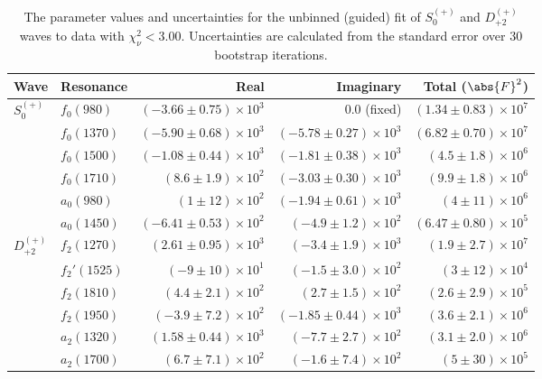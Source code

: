 \begin{table}[ht]
    \begin{center}
        \begin{tabular}{llrrr}\toprule
        Wave & Resonance & Real & Imaginary & Total ($\abs{F}^2$) \\\midrule
$S_{0}^{(+)}$ & $f_{0}(980)$ & $(-3.66 \pm 0.75) \times 10^{3}$ & $0.0$ (fixed) & $(1.34 \pm 0.83) \times 10^{7}$ \\
 & $f_{0}(1370)$ & $(-5.90 \pm 0.68) \times 10^{3}$ & $(-5.78 \pm 0.27) \times 10^{3}$ & $(6.82 \pm 0.70) \times 10^{7}$ \\
 & $f_{0}(1500)$ & $(-1.08 \pm 0.44) \times 10^{3}$ & $(-1.81 \pm 0.38) \times 10^{3}$ & $(4.5 \pm 1.8) \times 10^{6}$ \\
 & $f_{0}(1710)$ & $(8.6 \pm 1.9) \times 10^{2}$ & $(-3.03 \pm 0.30) \times 10^{3}$ & $(9.9 \pm 1.8) \times 10^{6}$ \\
 & $a_{0}(980)$ & $(1 \pm 12) \times 10^{2}$ & $(-1.94 \pm 0.61) \times 10^{3}$ & $(4 \pm 11) \times 10^{6}$ \\
 & $a_{0}(1450)$ & $(-6.41 \pm 0.53) \times 10^{2}$ & $(-4.9 \pm 1.2) \times 10^{2}$ & $(6.47 \pm 0.80) \times 10^{5}$ \\
$D_{+2}^{(+)}$ & $f_{2}(1270)$ & $(2.61 \pm 0.95) \times 10^{3}$ & $(-3.4 \pm 1.9) \times 10^{3}$ & $(1.9 \pm 2.7) \times 10^{7}$ \\
 & $f_{2}'(1525)$ & $(-9 \pm 10) \times 10^{1}$ & $(-1.5 \pm 3.0) \times 10^{2}$ & $(3 \pm 12) \times 10^{4}$ \\
 & $f_{2}(1810)$ & $(4.4 \pm 2.1) \times 10^{2}$ & $(2.7 \pm 1.5) \times 10^{2}$ & $(2.6 \pm 2.9) \times 10^{5}$ \\
 & $f_{2}(1950)$ & $(-3.9 \pm 7.2) \times 10^{2}$ & $(-1.85 \pm 0.44) \times 10^{3}$ & $(3.6 \pm 2.1) \times 10^{6}$ \\
 & $a_{2}(1320)$ & $(1.58 \pm 0.44) \times 10^{3}$ & $(-7.7 \pm 2.7) \times 10^{2}$ & $(3.1 \pm 2.0) \times 10^{6}$ \\
 & $a_{2}(1700)$ & $(6.7 \pm 7.1) \times 10^{2}$ & $(-1.6 \pm 7.4) \times 10^{2}$ & $(5 \pm 30) \times 10^{5}$ \\\bottomrule
        \end{tabular}
    \caption{The parameter values and uncertainties for the unbinned (guided) fit of $S_{0}^{(+)}$ and $D_{+2}^{(+)}$ waves to data with $\chi^2_\nu < 3.00$. Uncertainties are calculated from the standard error over $30$ bootstrap iterations.}\label{tab:unbinned-fit-chisqdof-3.0-guided-Sp0p-Dp2p}
    \end{center}
\end{table}
